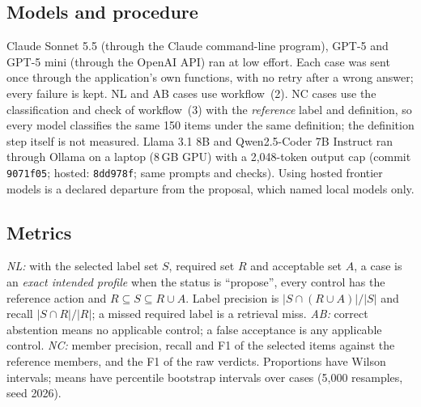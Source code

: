 \documentclass[conference]{IEEEtran}
\begin{document}
\subsection{Models and procedure}
Claude Sonnet 5.5 (through the Claude command-line program), GPT-5 and GPT-5 mini (through the OpenAI API) ran at low effort. Each case was sent once through the application's own functions, with no retry after a wrong answer; every failure is kept. NL and AB cases use workflow~(2). NC cases use the classification and check of workflow~(3) with the \emph{reference} label and definition, so every model classifies the same 150 items under the same definition; the definition step itself is not measured. Llama 3.1 8B and Qwen2.5-Coder 7B Instruct ran through Ollama on a laptop (8\,GB GPU) with a 2,048-token output cap (commit \texttt{9071f05}; hosted: \texttt{8dd978f}; same prompts and checks).
Using hosted frontier models is a declared departure from the proposal, which named local models only.

\subsection{Metrics}
\emph{NL:} with the selected label set $S$, required set $R$ and acceptable set $A$, a case is an \emph{exact intended profile} when the status is ``propose'', every control has the reference action and $R\subseteq S\subseteq R\cup A$. Label precision is $|S\cap(R\cup A)|/|S|$ and recall $|S\cap R|/|R|$; a missed required label is a retrieval miss. \emph{AB:} correct abstention means no applicable control; a false acceptance is any applicable control. \emph{NC:} member precision, recall and F1 of the selected items against the reference members, and the F1 of the raw verdicts. Proportions have Wilson intervals; means have percentile bootstrap intervals over cases (5,000 resamples, seed 2026).
\end{document}
